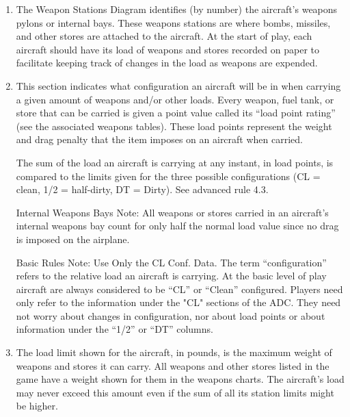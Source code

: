 \begin{enumerate}[resume]
    \item {} 
    The Weapon Stations Diagram identifies (by number) the aircraft's weapons pylons or internal bays. These weapons stations are where bombs, missiles, and other stores are attached to the aircraft. At the start of play, each aircraft should have its load of weapons and stores recorded on paper to facilitate keeping track of changes in the load as weapons are expended.

    \item {} 
    This section indicates what configuration an aircraft will be in when carrying a given amount of weapons and/or other loads. Every weapon, fuel tank, or store that can be carried is given a point value called its “load point rating” (see the associated weapons tables). These load points represent the weight and drag penalty that the item imposes on an aircraft when carried.

    The sum of the load an aircraft is carrying at any instant, in load points, is compared to the limits given for the three possible configurations (CL = clean, 1/2 = half-dirty, DT = Dirty).  See advanced rule 4.3.

    Internal Weapons Bays Note: All weapons or stores carried in an aircraft's internal weapons bay count for only half the normal load value since no drag is imposed on the airplane.

    Basic Rules Note:  Use Only the CL Conf. Data. The term “configuration” refers to the relative load an aircraft is carrying. At the basic level of play aircraft are always considered to be “CL” or “Clean” configured. Players need only refer to the information under the "CL" sections of the ADC. They need not worry about changes in configuration, nor about load points or about information under the “1/2” or “DT” columns.
    
    \item {}
    The load limit shown for the aircraft, in pounds, is the maximum weight of weapons and stores it can carry. All weapons and other stores listed in the game have a weight shown for them in the weapons charts. The aircraft's load may never exceed this amount even if the sum of all its station limits might be higher.


\end{enumerate}
